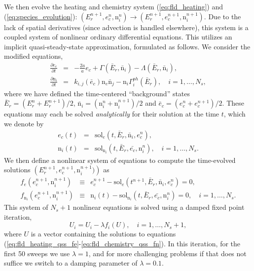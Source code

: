 We then evolve the heating and chemistry system (\ref{eq:fld_heating})
and (\ref{eq:species_evolution}):  
$(E_r^{n+1}, e_c^n, {\mathrm n}_i^n) \to (E_r^{n+1}, e_c^{n+1},
{\mathrm n}_i^{n+1})$.  Due to the lack of spatial derivatives (since
advection is handled elsewhere), this system is a coupled system of
nonlinear ordinary differential equations.  This utilizes an implicit
quasi-steady-state approximation, formulated as follows.  We consider
the modified equations,
\begin{eqnarray}
  \label{eq:fld_heating_qss}
  \frac{\partial e_c}{\partial t} &=& -\frac{2\dot{a}}{a} e_c +
    \Gamma\left(\bar{E}_r,\bar{\mathrm n}_i\right) - 
    \Lambda\left(\bar{E}_r,\bar{\mathrm n}_i\right), \\
  \label{eq:fld_chemistry_qss}
  \frac{\partial {\mathrm n}_i}{\partial t} &=& k_{i,j}\left(\bar{e}_c\right)
    {\mathrm n}_e \bar{\mathrm n}_j - {\mathrm n}_i 
    \Gamma_i^{ph}\left(\bar{E}_r\right), \quad i=1,\ldots,N_s,
\end{eqnarray}
where we have defined the time-centered ``background'' states
$\bar{E}_r = \left(E_r^{n}+E_r^{n+1}\right)/2$, 
$\bar{\mathrm n}_i = \left({\mathrm n}_i^{n}+{\mathrm n}_i^{n+1}\right)/2$
and $\bar{e}_c = \left(e_c^{n}+e_c^{n+1}\right)/2$.  These equations
may each be solved {\em analytically} for their solution at the time
$t$, which we denote by
\begin{eqnarray}
  \label{eq:fld_heating_qss_sol}
  e_c(t) &=& \text{sol}_{e}\left(t,\bar{E}_r,\bar{\mathrm n}_i,e_c^n\right), \\
  \label{eq:fld_chemistry_qss_sol}
  {\mathrm n}_i(t) &=& \text{sol}_{\mathrm n_i}
  \left(t,\bar{E}_r,\bar{e_c},\mathrm n_i^n\right), \quad i=1,\ldots,N_s. 
\end{eqnarray}
We then define a nonlinear system of equations to compute the
time-evolved solutions $\left(E_r^{n+1}, e_c^{n+1}, 
{\mathrm n}_i^{n+1})\right)$ as
\begin{eqnarray}
  \label{eq:fld_heating_qss_fe}
  f_e(e_c^{n+1},{\mathrm n}_i^{n+1}) &\equiv& e_c^{n+1} -
    \text{sol}_{e}\left(t^{n+1},\bar{E}_r,\bar{\mathrm n}_i,e_c^n\right)
    = 0, \\
  \label{eq:fld_chemistry_qss_fn}
  f_{\mathrm n_i}(e_c^{n+1},{\mathrm n}_i^{n+1}) &\equiv& 
    {\mathrm n}_i(t) - \text{sol}_{\mathrm n_i}
    \left(t,\bar{E}_r,\bar{e_c},\mathrm n_i^n\right)=0, \quad
    i=1,\ldots,N_s.  
\end{eqnarray}
This system of $N_s+1$ nonlinear equations is solved using a damped
fixed point iteration, 
\[
   U_i = U_i - \lambda f_i(U), \quad i=1,\ldots,N_s+1,
\]
where $U$ is a vector containing the solutions to equations
(\ref{eq:fld_heating_qss_fe}-\ref{eq:fld_chemistry_qss_fn}).  In this
iteration, for the first 50 sweeps we use $\lambda=1$, and for more
challenging problems if that does not suffice we switch to a damping
parameter of $\lambda=0.1$.
